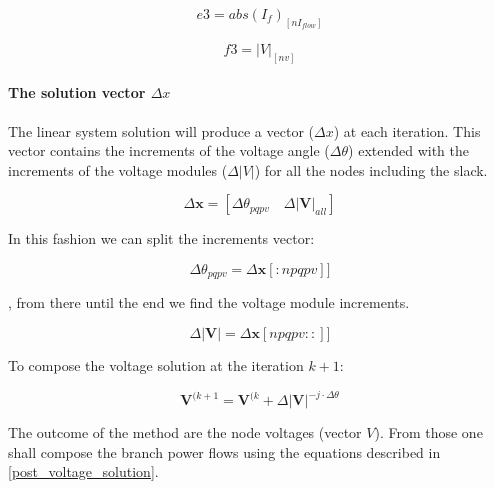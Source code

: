 \documentclass[a4paper,twoside,fleqn]{tufte-book}
\begin{document}

\begin{equation}
e3 = abs\left(I_f\right)_{[nI_{flow}]}
\end{equation}


\begin{equation}
f3 = |V|_{[nv]}
\end{equation}



\paragraph{The solution vector $\Delta x$}

The linear system solution will produce a vector ($\Delta x$) at each iteration. This vector contains the increments of the voltage angle ($\Delta \theta$) extended with the increments of the voltage modules ($\Delta |V|$) for all the nodes including the slack.

\begin{equation}
\Delta \textbf{x} = [ \Delta \theta_{pqpv} \quad \Delta|\textbf{V}|_{all} ]
\end{equation}

In this fashion we can split the increments vector:

\begin{equation}
\Delta \theta_{pqpv} = \Delta \textbf{x}[:npqpv]]
\end{equation}

, from there until the end we find the voltage module increments.

\begin{equation}
\Delta |\textbf{V}| = \Delta \textbf{x}[npqpv::]]
\end{equation}

To compose the voltage solution at the iteration $k+1$:

\begin{equation}
\textbf{V}^{(k+1} =  \textbf{V}^{(k} + \Delta |\textbf{V}| ^{-j \cdot \Delta \theta}
\end{equation}

The outcome of the method are the node voltages (vector $V$). From those one shall compose the branch power flows
using the equations described in \ref{post_voltage_solution}.
\end{document}
